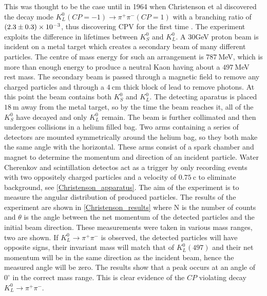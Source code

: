 This was thought to be the case until in 1964 when Christenson et al discovered the decay mode $K^{0}_{L}(CP = -1) \rightarrow \pi^+ \pi^- (CP = 1)$ with a branching ratio of $(2.3 \pm 0.3) \times 10^{-3}$, thus discovering CPV for the first time \cite{FirstCPV}. The experiment exploits the difference in lifetimes between $K^{0}_{S}$ and $K^{0}_{L}$. A 30GeV proton beam is incident on a metal target which creates a secondary beam of many different particles. The centre of mass energy for such an arrangement is $787~$MeV, which is more than enough energy to produce a neutral Kaon having about a $497~$MeV rest mass. The secondary beam is passed through a magnetic field to remove any charged particles and through a $4~$cm thick block of lead to remove photons. At this point the beam contains both $K^{0}_{S}$ and $K^{0}_{L}$. The detecting aparatus is placed $18~$m away from the metal target, so by the time the beam reaches it, all of the $K^{0}_{S}$ have decayed and only $K^{0}_{L}$ remain. The beam is further collimated and then undergoes collisions in a helium filled bag. Two arms containing a series of detectors are mounted symmetrically around the helium bag, so they both make the same angle with the horizontal. These arms consist of a spark chamber and magnet to determine the momentum and direction of an incident particle. Water Cherenkov and scintillation detectos act as a trigger by only recording events with two oppositely charged particles and a velocity of $0.75~$c to eliminate background, see \cref{Christenson_apparatus}. The aim of the experiment is to measure the angular distribution of produced particles. The results of the experiment are shown in \cref{Christenson_results} where N is the number of counts and $\theta$ is the angle between the net momentum of the detected particles and the initial beam direction. These measurements were taken in various mass ranges, two are shown. If $K^{0}_{L} \rightarrow \pi^+ \pi^-$ is observed, the detected particles will have opposite signs, their invariant mass will match that of $K^{0}_{L}(497)$ and their net momentum will be in the same direction as the incident beam, hence the measured angle will be zero. The results show that a peak occurs at an angle of $0^{\circ}$ in the correct mass range. This is clear evidence of the $CP$ violating decay $K^{0}_{L} \rightarrow \pi^+ \pi^-$.   

